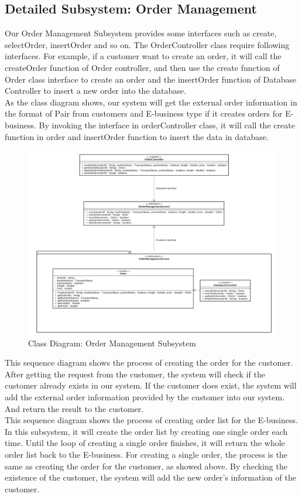 \documentclass[12pt]{scrreprt}
\begin{document}
\subsection{Detailed Subsystem: Order Management}
Our Order Management Subsystem provides some interfaces such as create, selectOrder, insertOrder and so on. 
The OrderController class require following interfaces. For example, if a customer want to create an order, it will call the createOrder function of Order controller, and then use the create function of Order class interface to create an order and the insertOrder function of Database Controller to insert a new order into the database.\\
As the class diagram shows, our system will get the external order information in the format of Pair from customers and E-business type if it creates orders for E-business. By invoking the interface in orderController class, it will call the create function in order and insertOrder function to insert the data in database.
\begin{figure}[htbp]
	\centering\includegraphics[width=6in]{DocumentRes/OrderManagement.png}
	\caption{Class Diagram: Order Management Subsystem}
\end{figure}
This sequence diagram shows the process of creating the order for the customer. After getting the request from the customer, the system will check if the customer already exists in our system. If the customer does exist, the system will add the external order information provided by the customer into our system. And return the result to the customer.\\
This sequence diagram shows the process of creating order list for the E-business. In this subsystem, it will create the order list by creating one single order each time. Until the loop of creating a single order finishes, it will return the whole order list back to the E-business. For creating a single order, the process is the same as creating the order for the customer, as showed above. By checking the existence of the customer, the system will add the new order’s information of the customer.
\end{document}

